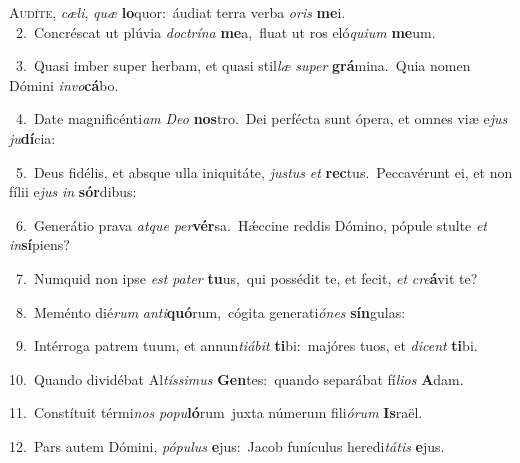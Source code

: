 \lettrine{\initial\textcolor{\initialcolor}{A}}{udíte,} \textit{cæ}\-\textit{li}, \textit{quæ} \textbf{lo}\-quor:~\star áudiat terra verba \textit{o}\-\textit{ris} \textbf{me}\-i.\\
{\numbfont\textcolor{\numbcolor}{~2.}}~Concréscat ut plúvia \textit{doc}\-\textit{trí}\textit{na} \textbf{me}\-a,~\star fluat ut ros eló\-\textit{qui}\-\textit{um} \textbf{me}\-um.\par
{\numbfont\textcolor{\numbcolor}{~3.}}~Quasi imber super herbam, et quasi stil\textit{læ} \textit{su}\-\textit{per} \textbf{grá}\-mina.~\star Quia nomen Dómini \textit{in}\-\textit{vo}\textbf{cá}bo.\par
{\numbfont\textcolor{\numbcolor}{~4.}}~Date magnificénti\textit{am} \textit{De}\-\textit{o} \textbf{nos}\-tro.~\star Dei perfécta sunt ópera, et omnes viæ e\textit{jus} \textit{ju}\-\textbf{dí}cia:\par
{\numbfont\textcolor{\numbcolor}{~5.}}~Deus fidélis, et absque ulla iniquitáte, \textit{jus}\-\textit{tus} \textit{et} \textbf{rec}\-tus.~\star Peccavérunt ei, et non fílii e\textit{jus} \textit{in} \textbf{sór}\-dibus:\par
{\numbfont\textcolor{\numbcolor}{~6.}}~Generátio prava \textit{at}\-\textit{que} \textit{per}\-\textbf{vér}sa.~\star Hǽccine reddis Dómino, pópule stulte \textit{et} \textit{in}\-\textbf{sí}piens?\par
{\numbfont\textcolor{\numbcolor}{~7.}}~Numquid non ipse \textit{est} \textit{pa}\-\textit{ter} \textbf{tu}\-us,~\star qui possédit te, et fecit, \textit{et} \textit{cre}\-\textbf{á}vit te?\par
{\numbfont\textcolor{\numbcolor}{~8.}}~Meménto dié\textit{rum} \textit{an}\-\textit{ti}\textbf{quó}rum,~\star cógita generati\-\textit{ó}\-\textit{nes} \textbf{sín}\-gulas:\par
{\numbfont\textcolor{\numbcolor}{~9.}}~Intérroga patrem tuum, et annun\-\textit{ti}\-\textit{á}\textit{bit} \textbf{ti}\-bi:~\star majóres tuos, et \textit{di}\-\textit{cent} \textbf{ti}\-bi.\par
{\numbfont\textcolor{\numbcolor}{10.}}~Quando dividébat Al\-\textit{tís}\-\textit{si}\textit{mus} \textbf{Gen}\-tes:~\star quando separábat fí\-\textit{li}\-\textit{os} \textbf{A}\-dam.\par
{\numbfont\textcolor{\numbcolor}{11.}}~Constítuit térmi\textit{nos} \textit{po}\-\textit{pu}\textbf{ló}rum~\star juxta númerum fili\-\textit{ó}\-\textit{rum} \textbf{Is}\-raël.\par
{\numbfont\textcolor{\numbcolor}{12.}}~Pars autem Dómini, \textit{pó}\-\textit{pu}\textit{lus} \textbf{e}\-jus:~\star Jacob funículus heredi\-\textit{tá}\-\textit{tis} \textbf{e}\-jus.\par

